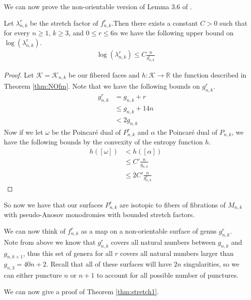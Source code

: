 We can now prove the non-orientable version of Lemma 3.6 of \cite{yazdi2018pseudo}.
\begin{lem}
\label{lem:bound}
Let $\lambda_{n,k}^r$ be the stretch factor of $f_{n,k}^r$.Then there exists a constant $C > 0$ such that for every $n \geq 1$, $k \geq 3$, and $0 \leq r \leq 6n$ we have the following upper bound on $\log(\lambda_{n,k}^r)$.
\begin{align*}
  \log(\lambda^r_{n,k}) \leq C\frac{n}{g^r_{n,k}}
\end{align*}
\end{lem}
\begin{proof}
  Let $\mathcal{K} = \mathcal{K}_{n,k}$ be our fibered faces and $h: \mathcal{K} \xrightarrow[]{} \mathbb{R}$
  the function described in Theorem \ref{thm:NOfm}. Note that we have the following bounds on $g_{n,k}^r$.
  \begin{align*}
    g^r_{n,k} &= g_{n,k} + r \\
              &\leq g_{n,k} + 14n \\
              &< 2g_{n,k}
  \end{align*}
  Now if we let $\omega$ be the Poincar\'e dual of $P^r_{n,k}$ and $\alpha$ the Poincar\'e dual of $P_{n,k}$, we have the following bounds by the convexity of the entropy
  function $h$.
  \begin{align*}
    h([\omega]) &< h([\alpha]) \\
                &\leq C'\frac{n}{g_{n,k}} \\
                &\leq 2C'\frac{n}{g^r_{n,k}}
  \end{align*}
\end{proof}

So now we have that our surfaces $P^r_{n,k}$ are isotopic to fibers of fibrations of $M_{n,k}$ with
pseudo-Anosov monodromies with bounded stretch factors.

We can now think of $f^r_{n,k}$ as a map on a non-orientable surface of genus $g^r_{n,k}$. Note from above we
know that $g^r_{n,k}$ covers all natural numbers between $g_{n,k}$ and $g_{n,k+1}$, thus this set of genera
for all $r$ covers all natural numbers larger than $g_{n,3} = 40n + 2$. Recall that all of these surfaces will
have $2n$ singularities, so we can either puncture $n$ or $n + 1$ to account for all possible number of
punctures.

We can now give a proof of Theorem \ref{thm:stretch1}.

